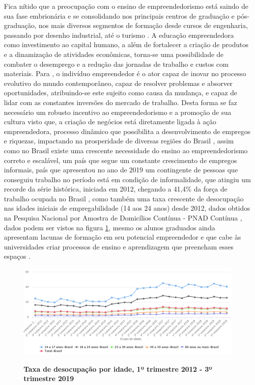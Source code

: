 Fica nítido que a preocupação com o ensino de empreendedorismo está saindo de sua fase embrionária e se consolidando nos principais  centros de graduação e pós-graduação, nos mais diversos segmentos de formação desde cursos de engenharia, passando por desenho industrial, até o turismo \cite{henrique_praticas_2008}. A educação empreendedora como investimento ao capital humano, a além de fortalecer a criação de produtos e a dinamização de atividades econômicas, torna-se uma possibilidade de combater o desemprego \cite{morais_empreendedorismo_2018} e a redução das jornadas de trabalho e custos com materiais. Para , o indivíduo empreendedor é o ator capaz de inovar no processo evolutivo do mundo contemporâneo, capaz de resolver problemas e absorver oportunidades, atribuindo-se este sujeito como causa da mudança, e capaz de lidar com as constantes inversões do mercado de trabalho. Desta forma se faz necessário um robusto incentivo ao empreendedorismo e a promoção de sua cultura visto que, a criação de negócios está diretamente ligada à ação empreendedora, processo dinâmico que possibilita a desenvolvimento de empregos e riquezas, impactando na prosperidade de diversas regiões do Brasil \cite{leite_aprendizagem_2015}, assim como no Brasil existe uma crescente necessidade do ensino ao empreendedorismo correto e escalável, um país que segue um constante crescimento de empregos informais, país que apresentou no ano de 2019 um contingente de pessoas que conseguiu trabalho no período está em condição de informalidade, que atingiu um recorde da série histórica, iniciada em 2012, chegando a 41,4\% da força de trabalho ocupada no Brasil \cite{ibge_informalidade_2019}, como também uma taxa crescente de desocupação nas idades iniciais de empregabilidade (14 aos 24 anos) desde 2012, dados obtidos na Pesquisa Nacional por Amostra de Domicílios Contínua - PNAD Contínua \cite{ibge_instituto_brasileiro_de_geografia_e_estatistica_pesquisa_2019}, dados podem ser vistos na figura \ref{figura_2}, mesmo os alunos graduados ainda apresentam lacunas de formação em seu potencial empreendedor e que cabe às universidades criar processos de ensino e aprendizagem que preencham esses espaços \cite{pietrovski_alise_2019}.


\begin{figure}[!htb]
\centering
\caption{\textbf{Taxa de desocupação por idade, 1º trimestre 2012 - 3º trimestre 2019}}
\includegraphics[scale=0.25]{Imagens/taxa_desocupacao.png}
\label{figura_2}
\end{figure}



